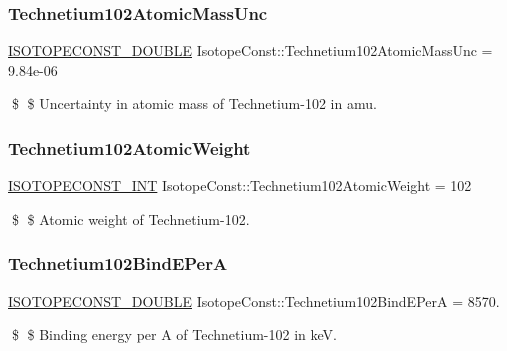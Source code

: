 \subsubsection{\texorpdfstring{Technetium102\+Atomic\+Mass\+Unc}{Technetium102AtomicMassUnc}}
{\footnotesize\ttfamily \mbox{\hyperlink{group___isotope_const-_macros_ga8f45a7272ce02c0b4c65c44636ed719a}{I\+S\+O\+T\+O\+P\+E\+C\+O\+N\+S\+T\+\_\+\+D\+O\+U\+B\+LE}} Isotope\+Const\+::\+Technetium102\+Atomic\+Mass\+Unc = 9.\+84e-\/06}

\$ \$ Uncertainty in atomic mass of Technetium-\/102 in amu. \mbox{\label{group___isotope_const-_technetium-_tc102_gaed80ba112954922d21f88d3f33218015}} 
\subsubsection{\texorpdfstring{Technetium102\+Atomic\+Weight}{Technetium102AtomicWeight}}
{\footnotesize\ttfamily \mbox{\hyperlink{group___isotope_const-_macros_ga5f18360b3e99483a35c32d789e62621c}{I\+S\+O\+T\+O\+P\+E\+C\+O\+N\+S\+T\+\_\+\+I\+NT}} Isotope\+Const\+::\+Technetium102\+Atomic\+Weight = 102}

\$ \$ Atomic weight of Technetium-\/102. \mbox{\label{group___isotope_const-_technetium-_tc102_ga36447595668ea984a6d561a5f54c14c3}} 
\subsubsection{\texorpdfstring{Technetium102\+Bind\+E\+PerA}{Technetium102BindEPerA}}
{\footnotesize\ttfamily \mbox{\hyperlink{group___isotope_const-_macros_ga8f45a7272ce02c0b4c65c44636ed719a}{I\+S\+O\+T\+O\+P\+E\+C\+O\+N\+S\+T\+\_\+\+D\+O\+U\+B\+LE}} Isotope\+Const\+::\+Technetium102\+Bind\+E\+PerA = 8570.}

\$ \$ Binding energy per A of Technetium-\/102 in keV. \mbox{\label{group___isotope_const-_technetium-_tc102_ga4924ec687d64cb7e04b1af3a69b91d8b}} 
